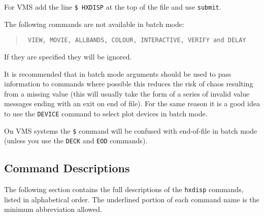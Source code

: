 For VMS add the line \verb!$ HXDISP! at the top of the file and use
\verb!submit!.

The following commands are not available in batch mode:
\begin{quote} \tt
VIEW, MOVIE, ALLBANDS, COLOUR, INTERACTIVE, VERIFY {\rm and} DELAY
\end{quote}
If they are specified they will be ignored.

It is recommended that in batch mode arguments should be used to pass
information to commands where possible this reduces the risk of chaos
resulting from a missing value (this will usually take the form of a
series of invalid value messages ending with an exit on end of file).
For the same reason it is a good idea to use the {\tt DEVICE} command
to select plot devices in batch mode.

On VMS systems the \verb!$! command will be confused with end-of-file
in batch mode (unless you use the \verb!DECK! and \verb!EOD! commands).

\subsection{Command Descriptions}

The following section contains the full descriptions of the
\verb!hxdisp! commands, listed in alphabetical order. The underlined
portion of each command name is the minimum abbreviation allowed.


